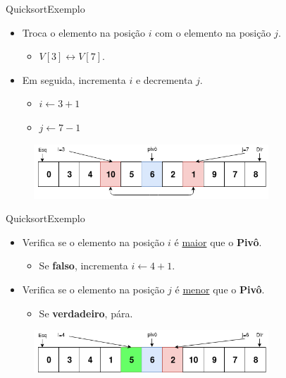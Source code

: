\documentclass[aspectratio=169]{beamer}
\begin{document}
\begin{frame}{Quicksort}{Exemplo}
\begin{itemize}
 \item Troca o elemento na posição $i$ com o elemento na posição $j$.
 \begin{itemize}
 \item $V[3] \leftrightarrow V[7]$.
 \end{itemize}
 \item Em seguida, incrementa $i$ e decrementa $j$.
 \begin{itemize}
 \item $i \leftarrow 3 + 1$
 \item $j \leftarrow 7 - 1$ 
 \end{itemize} 
\end{itemize}

\begin{figure}[!h]
  \centering
  \includegraphics[width=250pt]{imgs/quick/quick10.png}
  \label{fig_quick10}
\end{figure}
\end{frame}


\begin{frame}{Quicksort}{Exemplo}
\begin{itemize}
 \item Verifica se o elemento na posição $i$ é \underline{maior} que o {\bf Pivô}.
 \begin{itemize}
 \item Se {\bf falso}, incrementa $i \leftarrow 4 + 1$.
 \end{itemize}
 \item Verifica se o elemento na posição $j$ é \underline{menor} que o {\bf Pivô}.
 \begin{itemize}
 \item Se {\bf verdadeiro}, pára.
 \end{itemize}
\end{itemize}

\begin{figure}[!h]
  \centering
  \includegraphics[width=250pt]{imgs/quick/quick11.png}
  \label{fig_quick11}
\end{figure}
\end{frame}
\end{document}
